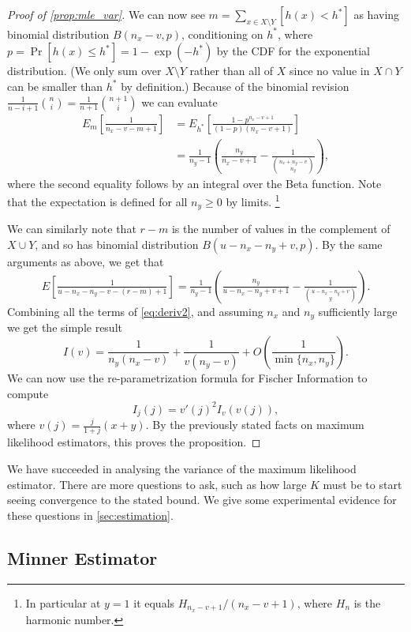 \begin{proof}[Proof of \cref{prop:mle_var}]
   We can now see $m=\sum_{x\in X\setminus Y} [h(x) < h^*]$ as having binomial distribution $B(n_x-v, p)$, conditioning on $h^*$, where $p=\Pr[h(x)\le h^*] = 1-\exp(-h^*)$ by the CDF for the exponential distribution.
   (We only sum over $X\setminus Y$ rather than all of $X$ since no value in $X\cap Y$ can be smaller than $h^*$ by definition.)
   Because of the binomial revision
   $\frac1{n-i+1}\binom{n}{i} = \frac1{n+1}\binom{n+1}{i}$
   we can evaluate
   \begin{align}
      E_m\left[\tfrac1{n_x-v-m+1}\right]
      &= E_{h^*}\left[\tfrac{1-p^{n_x-v+1}}{(1-p)(n_x-v+1)}\right]
    \\&= \tfrac1{n_y-1}\left(\tfrac{n_y}{n_x-v+1} - \tfrac1{\binom{n_x+n_y-v}{n_y}}\right),
   \end{align}
   where the second equality follows by an integral over the Beta function.
   Note that the expectation is defined for all $n_y\ge 0$ by limits.%
   \footnote{In particular at $y=1$ it equals $H_{n_x-v+1}/(n_x-v+1)$, where $H_n$ is the harmonic number.}

   We can similarly note that $r-m$ is the number of values in the complement of $X\cup Y$, and so has binomial distribution $B(u-n_x-n_y+v, p)$.
   By the same arguments as above, we get that
   \[
      E\left[\tfrac1{u-n_x-n_y-v-(r-m)+1}\right]
      = \tfrac1{n_y-1}\left(\tfrac{n_y}{u-n_x-n_y+v+1} - \tfrac1{\binom{u-n_x-n_y+v}{y}}\right).
   \]
   Combining all the terms of \cref{eq:deriv2}, and assuming $n_x$ and $n_y$ sufficiently large we get the simple result
   \[
   I(v)
   = \frac{1}{n_y(n_x-v)} + \frac1{v(n_y-v)} + O\left( \frac{1}{\min\{n_x,n_y\}} \right).
   \]
   We can now use the re-parametrization formula for Fischer Information to compute
   \[
      I_j(j) = v'(j)^{2}I_v(v(j)),
   \]
   where $v(j) = \frac{j}{1+j}(x+y)$.
   By the previously stated facts on maximum likelihood estimators, this proves the proposition.
\end{proof}

We have succeeded in analysing the variance of the maximum likelihood estimator.
There are more questions to ask, such as how large $K$ must be to start seeing convergence to the stated bound.
We give some experimental evidence for these questions in \cref{sec:estimation}.

\subsection{Minner Estimator}\label{sec:minner}

